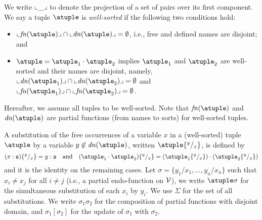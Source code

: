 We write $\llcorner\_\lrcorner$ to denote the projection of a set of pairs over its first component. 
%
We say a tuple $\atuple$ is {\em well-sorted} if the following two
conditions hold:
\begin{itemize}
\item
  $\supp{\fn\atuple} \cap \supp{\dn{\atuple}} = \emptyset$, i.e., free and
  defined names are disjoint; and
\item
  $\atuple = \atuple_1 \cdot \atuple_2$ implies $\atuple_1$ and
  $\atuple_2$ are well-sorted and their names are disjoint, namely, 
  $\supp{\dn{\atuple_1}} \cap \supp{\dn{\atuple_2}} =  \emptyset$
  and 
  $\supp{\fn{\atuple_1}} \cap \supp{\fn{\atuple_2}} =  \emptyset$.
\end{itemize}
%
Hereafter, we assume all tuples to be well-sorted.
%
Note that $\fn{\atuple}$ and $\dn{\atuple}$ are partial functions (from names to sorts)
for well-sorted tuples.

A substitution of the free occurrences of a variable $x$ in a
(well-sorted) tuple $\atuple$ 
by a variable $y\not\in \dn{\atuple}$, written $\atuple \sust x y$, is
defined by
%
\[
(x  : \asort) \sust x y  = y : \asort
\quad\text{and}\quad
(\atuple_1 \cdot \atuple_2) \sust x y  = 
(\atuple_1\sust x y) \cdot (\atuple_2\sust x y) 
\]
%
and it is the identity on the remaining cases. Let
$\sigma = \{y_1/x_1,\ldots,y_n/x_n\}$ such that $x_i\neq x_j$ for all
$i\neq j$ (i.e., a partial endo-function on $\mathcal{V}$), we write
$\atuple\sigma$ for the simultaneous substitution of each $x_i$ by
$y_i$.
%
We use $\Sigma$ for the set of all substitutions. We write
$\sigma_1\sigma_2$ for the composition of partial functions with
disjoint domain, and $\sigma_1[\sigma_2]$ for the update of $\sigma_1$
with $\sigma_2$.

